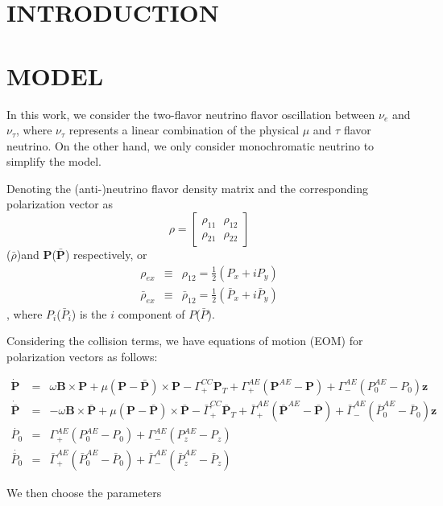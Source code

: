 \documentclass[aps,prd,twocolumn,amsmath,amssymb,groupedaddress]{revtex4-2}
\begin{document}
\section{\label{sec:intro} INTRODUCTION}

\subsection{}
\subsubsection{}

\section{\label{sec:model} MODEL}
In this work, we consider the two-flavor neutrino flavor oscillation between $\nu_e$ and $\nu_\tau$, where $\nu_\tau$ represents a linear combination of the physical $\mu$ and $\tau$ flavor neutrino. On the other hand, we only consider monochromatic neutrino to simplify the model.

Denoting the (anti-)neutrino flavor density matrix and the corresponding polarization vector as
\begin{equation}
	\rho = \begin{bmatrix}
		\rho_{11} ~~~ \rho_{12} \\
		\rho_{21} ~~~ \rho_{22}
	\end{bmatrix}
\end{equation}
($\bar{\rho}$)and $\textbf{P}$($\bar{\textbf{P}}$) respectively, or
\begin{eqnarray}
	\rho_{ex} &\equiv& \rho_{12} = \frac{1}{2}\left(P_x + i P_y\right) \\
	\bar{\rho}_{ex} &\equiv& \bar{\rho}_{12} = \frac{1}{2}\left(\bar{P}_x + i \bar{P}_y\right) 
\end{eqnarray}, where $P_i$($\bar{P}_i$) is the $i$ component of $P$($\bar{P}$). 

Considering the collision terms, we have equations of motion (EOM) for polarization vectors as follows:
\begin{widetext}
\begin{eqnarray} 
	\dot{\textbf{P}} &=& \omega \textbf{B} \times \textbf{P}+ \mu (\textbf{P}-\bar{\textbf{P}}) \times \textbf{P} - \Gamma^{CC}_+ \textbf{P}_T + \Gamma^{AE}_+ (\textbf{P}^{AE} - \textbf{P}) + \Gamma^{AE}_- (P^{AE}_0 -P_0)\textbf{z} \\
	\dot{\bar{\textbf{P}}} &=& -\omega \textbf{B} \times \bar{\textbf{P}}+ \mu (\textbf{P}-\bar{\textbf{P}}) \times \bar{\textbf{P}} - \bar{\Gamma}^{CC}_+ \bar{\textbf{P}}_T + \bar{\Gamma}^{AE}_+ (\bar{\textbf{P}}^{AE} - \bar{\textbf{P}}) + \bar{\Gamma}^{AE}_- (\bar{P}^{AE}_0 -\bar{P}_0)\textbf{z} \\
	\dot{P_0} &=& \Gamma^{AE}_+ (P^{AE}_0 -P_0) + \Gamma^{AE}_- (P^{AE}_z -P_z) \\
	\dot{\bar{P}_0} &=& \bar{\Gamma}^{AE}_+ (\bar{P}^{AE}_0 -\bar{P}_0) + \bar{\Gamma}^{AE}_- (\bar{P}^{AE}_z -\bar{P}_z)
\end{eqnarray}
\end{widetext}
We then choose the parameters
\end{document}
